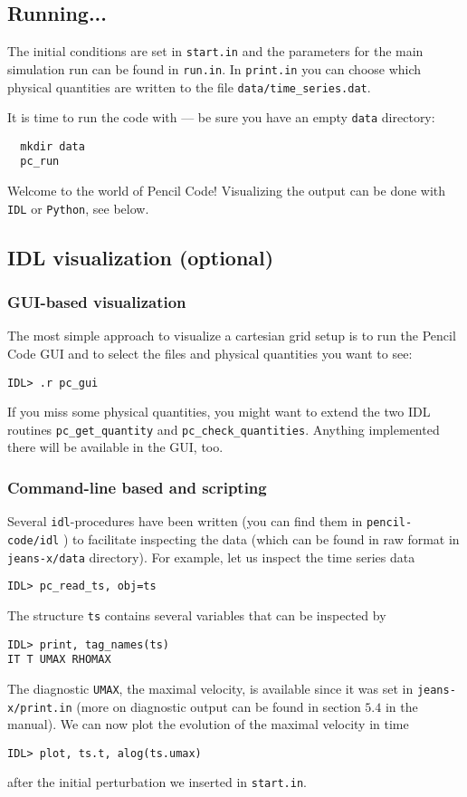 \documentclass[a4paper,12pt]{article}
\begin{document}
\subsection{Running...}

The initial conditions are set in \verb|start.in| and the parameters for the main simulation run can be found in \verb|run.in|.
In \verb|print.in| you can choose which physical quantities are written to the file \verb|data/time_series.dat|.

It is time to run the code with --- be sure you have an empty \verb|data| directory:
\begin{verbatim}
  mkdir data
  pc_run
\end{verbatim}

Welcome to the world of Pencil Code! Visualizing the output can be done with \verb|IDL| or \verb|Python|, see below.

\subsection{IDL visualization (optional)}

\subsubsection{GUI-based visualization}
The most simple approach to visualize a cartesian grid setup is to run the Pencil Code GUI and to select the files and physical quantities you want to see:
\begin{verbatim}
IDL> .r pc_gui
\end{verbatim}
If you miss some physical quantities, you might want to extend the two IDL routines \verb|pc_get_quantity| and \verb|pc_check_quantities|. Anything implemented there will be available in the GUI, too.

\subsubsection{Command-line based and scripting}
Several \verb|idl|-procedures have been written
(you can find them in \verb|pencil-code/idl| ) to facilitate inspecting the data
(which can be found in raw format in \verb|jeans-x/data| directory).  For
example, let us inspect the time series data
\begin{verbatim}
IDL> pc_read_ts, obj=ts
\end{verbatim}
The structure \verb|ts| contains several variables that can be inspected by
\begin{verbatim}
IDL> print, tag_names(ts)
IT T UMAX RHOMAX
\end{verbatim}
The diagnostic \verb|UMAX|, the maximal velocity, is available since it was set
in \verb|jeans-x/print.in| (more on diagnostic output can be found in section
$5.4$ in the manual).  We can now plot the evolution of the maximal velocity in
time
\begin{verbatim}
IDL> plot, ts.t, alog(ts.umax)
\end{verbatim}
after the initial perturbation we inserted in \verb|start.in|.
\end{document}

